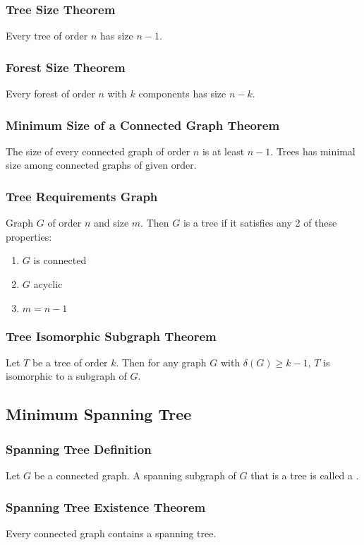 \subsubsection*{Tree Size Theorem}
Every tree of order $n$ has size $n-1$.

\subsubsection*{Forest Size Theorem}
Every forest of order $n$ with $k$ components has size $n-k$.

\subsubsection*{Minimum Size of a Connected Graph Theorem}
The size of every connected graph of order $n$ is at least $n-1$. Trees has minimal size among connected graphs of given order.

\subsubsection*{Tree Requirements Graph}
Graph $G$ of order $n$ and size $m$. Then $G$ is a tree if it satisfies any 2 of these properties:
\begin{enumerate}
    \item $G$ is connected
    \item $G$ acyclic
    \item $m = n-1$
\end{enumerate}

\subsubsection*{Tree Isomorphic Subgraph Theorem}
Let $T$ be a tree of order $k$. Then for any graph $G$ with $\delta(G) \geq k-1$, $T$ is isomorphic to a subgraph of $G$.

\subsection{Minimum Spanning Tree}

\subsubsection*{Spanning Tree Definition}
Let $G$ be a connected graph. A spanning subgraph of $G$ that is a tree is called a .

\subsubsection*{Spanning Tree Existence Theorem}
Every connected graph contains a spanning tree.

